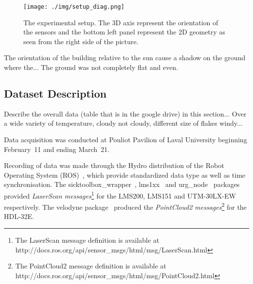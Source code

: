 \begin{figure}[h]
    \centering
    \texttt{[image: ./img/setup\_diag.png]}
    \caption{The experimental setup. The 3D axis represent the orientation of the sensors and the bottom left panel represent the 2D geometry as seen from the right side of the picture.}
    \label{fig:setup}
\end{figure}

The orientation of the building relative to the sun cause a shadow on the ground where the... The ground was not completely flat and even.

\subsection{Dataset Description}
Describe the overall data (table that is in the google drive) in this section... Over a wide variety of temperature, cloudy not cloudy, different size of flakes windy...

Data acquisition was conducted at Pouliot Pavilion of Laval University beginning February~11 and ending March~21.

Recording of data was made through the Hydro distribution of the Robot Operating System (ROS)~\cite{ROSWeb}, which provide standardized data type as well as time synchronisation. The sicktoolbox\_wrapper~\cite{LMS200Web}, lms1xx~\cite{LMS151Web} and urg\_node~\cite{HokuyoWeb} packages provided \textit{LaserScan messages}\footnote{The LaserScan message definition is available at http://docs.ros.org/api/sensor\_msgs/html/msg/LaserScan.html} for the LMS200, LMS151 and UTM-30LX-EW respectively. The velodyne package~\cite{VelodyneWeb} produced the \textit{PointCloud2 messages}\footnote{The PointCloud2 message definition is available at http://docs.ros.org/api/sensor\_msgs/html/msg/PointCloud2.html} for the HDL-32E.

